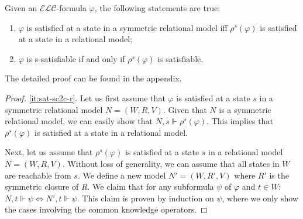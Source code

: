 \documentclass{article}
\renewcommand{\phi}{\varphi}
\newcommand{\langc}{\ensuremath{\mathcal{ELC}}\xspace}
\begin{document}
\begin{propositionrep}\label{lem:sat-sc2c}
Given an $\langc$-formula $\phi$, the following statements are true:
\begin{enumerate}
\item \label{it:sat-sc2c-r} $\phi$ is satisfied at a state in a symmetric relational model iff $\rho^s(\phi)$ is satisfied at a state in a relational model;
\item \label{it:sat-sc2c} $\phi$ is s-satisfiable if and only if $\rho^s(\phi)$ is satisfiable.
\end{enumerate}
\end{propositionrep}
\begin{inlineproof}
The detailed proof can be found in the appendix.
\end{inlineproof}
\begin{proof}
\ref{it:sat-sc2c-r}. Let us first assume that $\phi$ is satisfied at a state $s$ in a symmetric relational model $N=(W,R,V)$. Given that $N$ is a symmetric relational model, we can easily show that $N,s\Vdash\rho^s(\phi)$. This implies that $\rho^s(\phi)$ is satisfied at a state in a relational model.

Next, let us assume that $\rho^s(\phi)$ is satisfied at a state $s$ in a relational model $N=(W,R,V)$. Without loss of generality, we can assume that all states in $W$ are reachable from $s$. We define a new model $N'=(W,R',V)$ where $R'$ is the symmetric closure of $R$. We claim that for any subformula $\psi$ of $\phi$ and $t \in W$: $N,t\Vdash\psi \Longleftrightarrow N',t\Vdash\psi$. This claim is proven by induction on $\psi$, where we only show the cases involving the common knowledge operators.


\end{proof}
\end{document}
